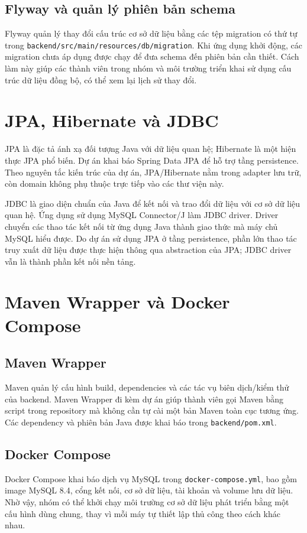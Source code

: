 \subsection{Flyway và quản lý phiên bản schema}
Flyway quản lý thay đổi cấu trúc cơ sở dữ liệu bằng các tệp migration có thứ tự trong \texttt{backend/src/main/resources/db/migration}. Khi ứng dụng khởi động, các migration chưa áp dụng được chạy để đưa schema đến phiên bản cần thiết. Cách làm này giúp các thành viên trong nhóm và môi trường triển khai sử dụng cấu trúc dữ liệu đồng bộ, có thể xem lại lịch sử thay đổi.

\section{JPA, Hibernate và JDBC}

JPA là đặc tả ánh xạ đối tượng Java với dữ liệu quan hệ; Hibernate là một hiện thực JPA phổ biến. Dự án khai báo Spring Data JPA để hỗ trợ tầng persistence. Theo nguyên tắc kiến trúc của dự án, JPA/Hibernate nằm trong adapter lưu trữ, còn domain không phụ thuộc trực tiếp vào các thư viện này.

JDBC là giao diện chuẩn của Java để kết nối và trao đổi dữ liệu với cơ sở dữ liệu quan hệ. Ứng dụng sử dụng MySQL Connector/J làm JDBC driver. Driver chuyển các thao tác kết nối từ ứng dụng Java thành giao thức mà máy chủ MySQL hiểu được. Do dự án sử dụng JPA ở tầng persistence, phần lớn thao tác truy xuất dữ liệu được thực hiện thông qua abstraction của JPA; JDBC driver vẫn là thành phần kết nối nền tảng.

\section{Maven Wrapper và Docker Compose}

\subsection{Maven Wrapper}
Maven quản lý cấu hình build, dependencies và các tác vụ biên dịch/kiểm thử của backend. Maven Wrapper đi kèm dự án giúp thành viên gọi Maven bằng script trong repository mà không cần tự cài một bản Maven toàn cục tương ứng. Các dependency và phiên bản Java được khai báo trong \texttt{backend/pom.xml}.

\subsection{Docker Compose}
Docker Compose khai báo dịch vụ MySQL trong \texttt{docker-compose.yml}, bao gồm image MySQL 8.4, cổng kết nối, cơ sở dữ liệu, tài khoản và volume lưu dữ liệu. Nhờ vậy, nhóm có thể khởi chạy môi trường cơ sở dữ liệu phát triển bằng một cấu hình dùng chung, thay vì mỗi máy tự thiết lập thủ công theo cách khác nhau.

